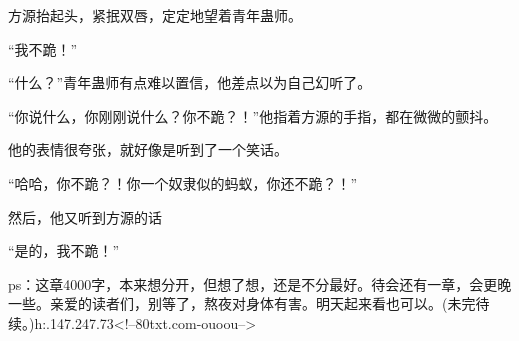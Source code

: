 \begin{this_body}
方源抬起头，紧抿双唇，定定地望着青年蛊师。

“我不跪！”

“什么？”青年蛊师有点难以置信，他差点以为自己幻听了。

“你说什么，你刚刚说什么？你不跪？！”他指着方源的手指，都在微微的颤抖。

他的表情很夸张，就好像是听到了一个笑话。

“哈哈，你不跪？！你一个奴隶似的蚂蚁，你还不跪？！”

然后，他又听到方源的话

“是的，我不跪！”

ps：这章4000字，本来想分开，但想了想，还是不分最好。待会还有一章，会更晚一些。亲爱的读者们，别等了，熬夜对身体有害。明天起来看也可以。(未完待续。)h:.147.247.73<!--80txt.com-ouoou-->

\end{this_body}

